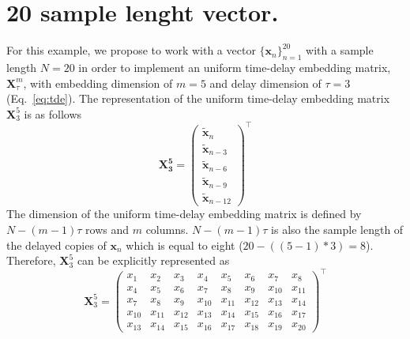\section{20 sample lenght vector.}
For this example, we propose to work with a vector $\{ \boldsymbol{x}_n \}_{n=1}^{20}$
with a sample length $N=20$ in order to implement an uniform time-delay embedding matrix, 
$\boldsymbol{X}^{m}_{\tau} $, with embedding dimension of $m=5$ 
and delay dimension of $\tau=3$ (Eq.~\eqref{eq:tde}).%
The representation of the uniform time-delay embedding matrix
$\boldsymbol{X}^{5}_{3}$ is as follows
\begin{equation}\label{eq:etde_example}
\boldsymbol{X^5_3} =
\begin{pmatrix}
  \boldsymbol{ \tilde{x} }_n \\
  \boldsymbol{ \tilde{x} }_{n-3} \\
  \boldsymbol{ \tilde{x} }_{n-6} \\
  \boldsymbol{ \tilde{x} }_{n-9} \\
  \boldsymbol{ \tilde{x} }_{n-12}
\end{pmatrix}^\intercal
\end{equation}
The dimension of the uniform time-delay embedding matrix is defined by
$N-(m-1)\tau$ rows and $m$ columns.
$N-(m-1)\tau$ is also the sample length of the delayed copies of $\boldsymbol{x}_n$ 
which is equal to eight ($20-((5-1)*3)=8$).
Therefore, $\boldsymbol{X}^{5}_{3}$ can be explicitly represented as
\begin{equation}\label{eq:etdee1}
\boldsymbol{X}^5_3 =
\begin{pmatrix}
  x_1 & x_2 & x_3 & x_4 & x_5 & x_6 & x_7 & x_8 \\
  x_4 & x_5 & x_6 & x_7 & x_8 & x_9 & x_{10} & x_{11} \\
  x_{7} & x_{8} & x_{9} & x_{10} & x_{11} & x_{12} & x_{13} & x_{14} \\
  x_{10} & x_{11} & x_{12} & x_{13} & x_{14} & x_{15} & x_{16} & x_{17} \\
  x_{13} & x_{14} & x_{15} & x_{16} & x_{17} & x_{18} & x_{19} & x_{20}
\end{pmatrix}^\intercal
\end{equation}

